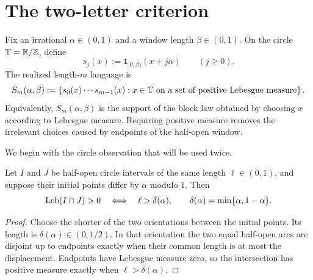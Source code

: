 \section{The two-letter criterion}\label{sec:classification}

Fix an irrational \(\alpha\in(0,1)\) and a window length
\(\beta\in(0,1)\).  On the circle \(\mathbb{T}=\mathbb{R}/\mathbb{Z}\), define
\[
s_j(x):=\mathbf{1}_{[0,\beta)}(x+j\alpha)
\qquad(j\geq0).
\]
The realized length-\(m\) language is
\[
S_m(\alpha,\beta):=
\left\{s_0(x)\cdots s_{m-1}(x):
x\in\mathbb{T}\text{ on a set of positive Lebesgue measure}\right\}.
\]
Equivalently, \(S_m(\alpha,\beta)\) is the support of the block law obtained
by choosing \(x\) according to Lebesgue measure.  Requiring positive measure
removes the irrelevant choices caused by endpoints of the half-open window.

We begin with the circle observation that will be used twice.

\begin{lemma}\label{lem:interval-overlap}
Let \(I\) and \(J\) be half-open circle intervals of the same length
\(\ell\in(0,1)\), and suppose their initial points differ by
\(\alpha\) modulo \(1\).  Then
\[
\operatorname{Leb}(I\cap J)>0
\quad\Longleftrightarrow\quad
\ell>\delta(\alpha),
\qquad
\delta(\alpha)=\min\{\alpha,1-\alpha\}.
\]
\end{lemma}

\begin{proof}
Choose the shorter of the two orientations between the initial points.
Its length is \(\delta(\alpha)\in(0,1/2)\).  In that orientation the two
equal half-open arcs are disjoint up to endpoints exactly when their common
length is at most the displacement.  Endpoints have Lebesgue measure zero,
so the intersection has positive measure exactly when
\(\ell>\delta(\alpha)\).
\end{proof}

